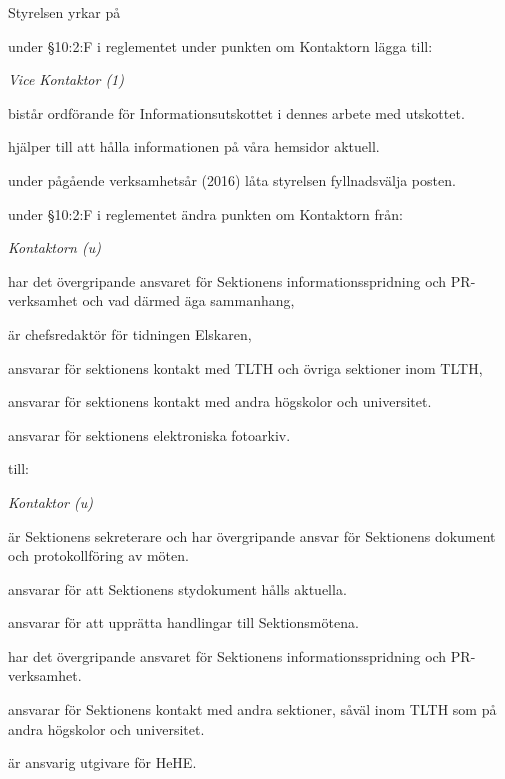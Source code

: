 \documentclass[../_main/handlingar.tex]{subfiles}
\begin{document}
Styrelsen yrkar på
\begin{attsatser}
    \att under \S10:2:F i reglementet under punkten om Kontaktorn lägga till:\par
    {\it
    Vice Kontaktor (1)
    \begin{tightdashlist}
        \item bistår ordförande för Informationsutskottet i dennes arbete med utskottet.
        \item hjälper till att hålla informationen på våra hemsidor aktuell.
    \end{tightdashlist}
    }
    \att under pågående verksamhetsår (2016) låta styrelsen fyllnadsvälja posten.

    \newpage

    \att under \S10:2:F i reglementet ändra punkten om Kontaktorn från:\par
    {\it
    Kontaktorn (u)
    \begin{tightdashlist}
        \item har det övergripande ansvaret för Sektionens informationsspridning och PR-verksamhet och vad därmed äga sammanhang,
        \item är chefsredaktör för tidningen Elskaren,
        \item ansvarar för sektionens kontakt med TLTH och övriga sektioner inom TLTH,
        \item ansvarar för sektionens kontakt med andra högskolor och universitet.
        \item ansvarar för sektionens elektroniska fotoarkiv.
    \end{tightdashlist}
    }
    till:\par
    {\it
    Kontaktor (u)
    \begin{tightdashlist}
        \item är Sektionens sekreterare och har övergripande ansvar för Sektionens dokument och protokollföring av möten.
        \item ansvarar för att Sektionens stydokument hålls aktuella.
        \item ansvarar för att upprätta handlingar till Sektionsmötena.
        \item har det övergripande ansvaret för Sektionens informationsspridning och PR-verksamhet.
        \item ansvarar för Sektionens kontakt med andra sektioner, såväl inom TLTH som på andra högskolor och universitet.
        \item är ansvarig utgivare för HeHE.
    \end{tightdashlist}
    }


\end{attsatser}
\end{document}
